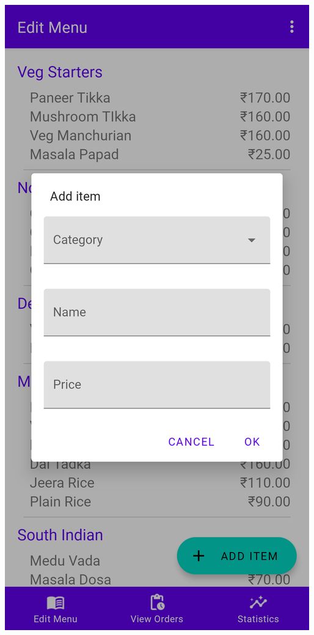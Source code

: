 \documentclass{article}
\begin{document}
\begin{center}
\includegraphics[scale=0.15]{add-item}
\end{center}
\end{document}
